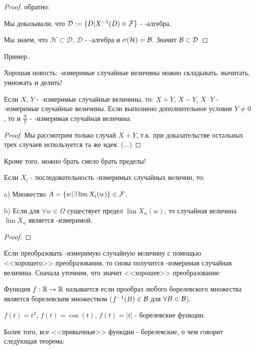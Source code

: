 {\begin{proof}
обратно:

Мы доказывали, что $\mathcal{D}:=\{D|X^{-1}(D)\in\mathcal{F}\}$ - \s-алгебра.

Мы знаем, что $\mathcal{H}\subset\mathcal{D}$, $\mathcal{D}$ - \s-алгебра и $\sigma(\mathcal{H})=\mathcal{B}$. Значит $\mathcal{B}\subset\mathcal{D}$
\end{proof}


Пример..


Хорошая новость: \F-измеримые случайные величины можно складывать, вычитать, умножать и делить!

\begin{myth} Если $X$, $Y$ - \F-измеримые случайные величины, то: $X+Y$, $X-Y$, $X\cdot Y$ - \F-измеримые случайные величины. Если выполнено дополнительное условие $Y\neq 0$, то и $\frac{X}{Y}$ - \F-измеримая случайная величина.
\end{myth}
\begin{proof} Мы рассмотрим только случай $X+Y$, т.к. при доказательстве остальных трех случаев используется та же идея.
(...)
\end{proof}


Кроме того, можно брать смело брать пределы!

\begin{myth} Если $X_{i}$ - последовательность \F-измеримых случайных величин, то:

a) Множество $A=\{w|\exists \lim X_{i}(w)\}\in\mathcal{F}$.

b) Если для $\forall w\in\Omega$ существует предел $\lim X_{n}(w)$, то случайная величина $\lim X_{n}$ является \F-измеримой.
\end{myth}
\begin{proof}
\end{proof}

Если преобразовать \F-измеримую случайную величину с помощью <<хорошего>> преобразования, то снова получится \F-измеримая случайная величина.
Сначала уточним, что значит <<хорошее>> преобразование:

\begin{mydef} Функция $f:\mathbb R\rightarrow\mathbb R$ называется  если прообраз любого борелевского множества является борелевским множеством ($f^{-1}(B)\in\mathcal{B}$ для $\forall B\in \mathcal{B}$).
\end{mydef}
\begin{myex} $f(t)=t^{2}$, $f(t)=\cos(t)$, $f(t)=|t|$ - борелевские функции.
\end{myex}

Более того, все <<привычные>> функции - борелевские, о чем говорит следующая теорема:

}
